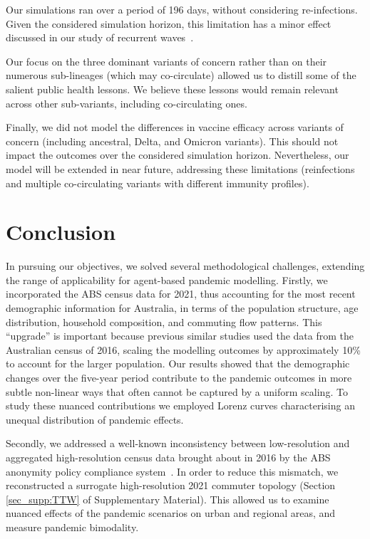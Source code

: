 \documentclass{article}
\begin{document}
Our simulations ran over a period of 196 days, without considering re-infections. 
Given the considered simulation horizon, this limitation has a minor effect discussed in our study of recurrent waves~\cite{chang_persistence_2023}. 

Our focus on the three dominant variants of concern rather than on their numerous sub-lineages (which may co-circulate) allowed us to distill some of the salient public health lessons. We believe these lessons would remain relevant across other sub-variants, including co-circulating ones.

Finally, we did not model the differences in vaccine efficacy across variants of concern (including ancestral, Delta, and Omicron variants). This should not impact the outcomes over the considered simulation horizon. Nevertheless, our model will be extended in near future, addressing these limitations (reinfections and multiple co-circulating variants with different immunity profiles).

\section{Conclusion}
In pursuing our objectives, we solved several methodological challenges, extending the range of applicability for agent-based pandemic modelling. Firstly, we incorporated the ABS census data for 2021, thus accounting for the most recent demographic information for Australia, in terms of the population structure, age distribution, household composition, and commuting flow patterns. This ``upgrade'' is important because previous similar studies used the data from the Australian census of 2016, scaling the modelling outcomes by approximately 10\% to account for the larger population. Our results showed that the demographic changes  over the five-year period contribute to the pandemic outcomes in more subtle non-linear ways that often cannot be captured by a uniform scaling. To study these nuanced contributions we employed Lorenz curves characterising  an unequal distribution of pandemic effects. 

Secondly, we addressed a well-known inconsistency between low-resolution and aggregated high-resolution census data brought about in 2016 by the ABS anonymity policy compliance system~\cite{ABS_data_confidentiality_guide,fair_creating_2019}. 
In order to reduce this mismatch, 
we reconstructed a surrogate high-resolution 2021 commuter topology (Section \ref{sec_supp:TTW} of Supplementary Material). 
This allowed us to examine nuanced effects of the pandemic scenarios on urban and regional areas, and measure pandemic bimodality.
\end{document}
